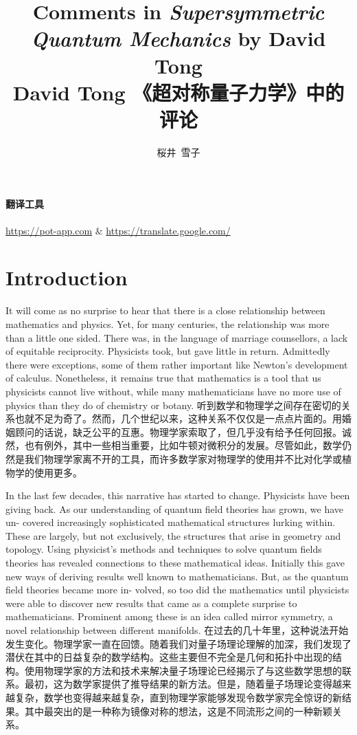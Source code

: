 \documentclass{ctexart}
\title{Comments in \textit{Supersymmetric Quantum Mechanics} by David Tong \\ David Tong 《超对称量子力学》中的评论}
\author{桜井\ 雪子}
\date{}
\begin{document}
\maketitle
\tableofcontents

\paragraph{翻译工具}\url{https://pot-app.com} \& \url{https://translate.google.com/}

\setcounter{section}{-1}
\section{Introduction}

\begin{paracol}{2}
It will come as no surprise to hear that there is a close relationship between mathematics and physics. Yet, for many centuries, the relationship was more than a little one sided. There was, in the language of marriage counsellors, a lack of equitable reciprocity. Physicists took, but gave little in return. Admittedly there were exceptions, some of them rather important like Newton's development of calculus. Nonetheless, it remains true that mathematics is a tool that us physicists cannot live without, while many mathematicians have no more use of physics than they do of chemistry or botany.
\switchcolumn
听到数学和物理学之间存在密切的关系也就不足为奇了。然而，几个世纪以来，这种关系不仅仅是一点点片面的。用婚姻顾问的话说，缺乏公平的互惠。物理学家索取了，但几乎没有给予任何回报。诚然，也有例外，其中一些相当重要，比如牛顿对微积分的发展。尽管如此，数学仍然是我们物理学家离不开的工具，而许多数学家对物理学的使用并不比对化学或植物学的使用更多。
\switchcolumn*

In the last few decades, this narrative has started to change. Physicists have been giving back. As our understanding of quantum field theories has grown, we have un- covered increasingly sophisticated mathematical structures lurking within. These are largely, but not exclusively, the structures that arise in geometry and topology. Using physicist's methods and techniques to solve quantum fields theories has revealed connections to these mathematical ideas. Initially this gave new ways of deriving results well known to mathematicians. But, as the quantum field theories became more in- volved, so too did the mathematics until physicists were able to discover new results that came as a complete surprise to mathematicians. Prominent among these is an idea called mirror symmetry, a novel relationship between different manifolds.
\switchcolumn
在过去的几十年里，这种说法开始发生变化。物理学家一直在回馈。随着我们对量子场理论理解的加深，我们发现了潜伏在其中的日益复杂的数学结构。这些主要但不完全是几何和拓扑中出现的结构。使用物理学家的方法和技术来解决量子场理论已经揭示了与这些数学思想的联系。最初，这为数学家提供了推导结果的新方法。但是，随着量子场理论变得越来越复杂，数学也变得越来越复杂，直到物理学家能够发现令数学家完全惊讶的新结果。其中最突出的是一种称为镜像对称的想法，这是不同流形之间的一种新颖关系。
\switchcolumn*


\end{paracol}
\end{document}
